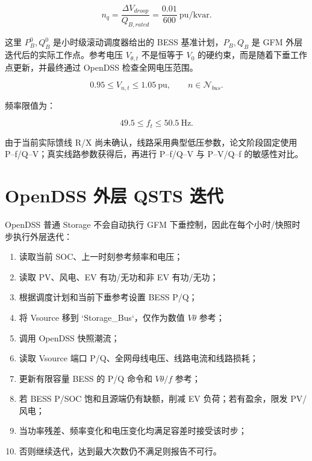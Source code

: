 \documentclass[UTF8,a4paper,11pt]{ctexart}
\begin{document}
\begin{equation}
n_q=\frac{\Delta V_{droop}}{Q_{B,rated}}
=\frac{0.01}{600}\ \text{pu/kvar}.
\end{equation}

这里 $P_B^0,Q_B^0$ 是小时级滚动调度器给出的 BESS 基准计划，$P_B,Q_B$ 是 GFM 外层迭代后的实际工作点。参考电压 $V_{\theta,t}$ 不是恒等于 $V_0$ 的硬约束，而是随着下垂工作点更新，并最终通过 OpenDSS 检查全网电压范围。

\begin{equation}
0.95\leq V_{n,t}\leq1.05\ \text{pu},
\qquad n\in\mathcal{N}_{bus}.
\end{equation}

频率限值为：

\begin{equation}
49.5\leq f_t\leq50.5\ \text{Hz}.
\end{equation}

由于当前实际馈线 R/X 尚未确认，线路采用典型低压参数，论文阶段固定使用 P--f/Q--V；真实线路参数获得后，再进行 P--f/Q--V 与 P--V/Q--f 的敏感性对比。

\section{OpenDSS 外层 QSTS 迭代}

OpenDSS 普通 Storage 不会自动执行 GFM 下垂控制，因此在每个小时/快照时步执行外层迭代：

\begin{enumerate}
  \item 读取当前 SOC、上一时刻参考频率和电压；
  \item 读取 PV、风电、EV 有功/无功和非 EV 有功/无功；
  \item 根据调度计划和当前下垂参考设置 BESS P/Q；
  \item 将 Vsource 移到 `Storage\_Bus`，仅作为数值 $V\theta$ 参考；
  \item 调用 OpenDSS 快照潮流；
  \item 读取 Vsource 端口 P/Q、全网母线电压、线路电流和线路损耗；
  \item 更新有限容量 BESS 的 P/Q 命令和 $V\theta/f$ 参考；
  \item 若 BESS P/SOC 饱和且源端仍有缺额，削减 EV 负荷；若有盈余，限发 PV/风电；
  \item 当功率残差、频率变化和电压变化均满足容差时接受该时步；
  \item 否则继续迭代，达到最大次数仍不满足则报告不可行。
\end{enumerate}
\end{document}
